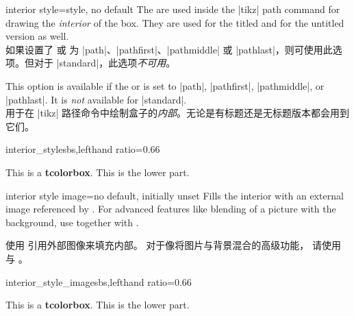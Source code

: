 \begin{docTcbKey}{interior style}{=}{style, no default}
The  are used inside the |tikz| path command
for drawing the \emph{interior} of the box. They are used for the titled
and for the untitled version as well.\\
如果设置了  或  为 |path|、|pathfirst|、|pathmiddle| 或 |pathlast|，则可使用此选项。但对于 |standard|，此选项\emph{不可用}。

This option is available if the 
or  is set to
|path|, |pathfirst|, |pathmiddle|, or |pathlast|.
It is \emph{not} available for |standard|.\\
 用于在 |tikz| 路径命令中绘制盒子的\emph{内部}。无论是有标题还是无标题版本都会用到它们。
\begin{exdispExample*}{interior_style}{sbs,lefthand ratio=0.66}

\begin{tcolorbox}[enhanced,title=My title,
interior style={left color=red!20!white,
                right color=yellow!50!white}]
This is a \textbf{tcolorbox}.
\tcblower
This is the lower part.
\end{tcolorbox}
\end{exdispExample*}
\end{docTcbKey}

\begin{docTcbKey}{interior style image}{=}{no default, initially unset}
Fills the interior with an external image referenced by .
For advanced features like blending of a picture with the background,
use  together with .

使用  引用外部图像来填充内部。 对于像将图片与背景混合的高级功能， 请使用  与 。
\begin{exdispExample*}{interior_style_image}{sbs,lefthand ratio=0.66}

\begin{tcolorbox}[enhanced,title=My title,
interior style image=goldshade.png]
This is a \textbf{tcolorbox}.
\tcblower
This is the lower part.
\end{tcolorbox}
\end{exdispExample*}
\end{docTcbKey}


